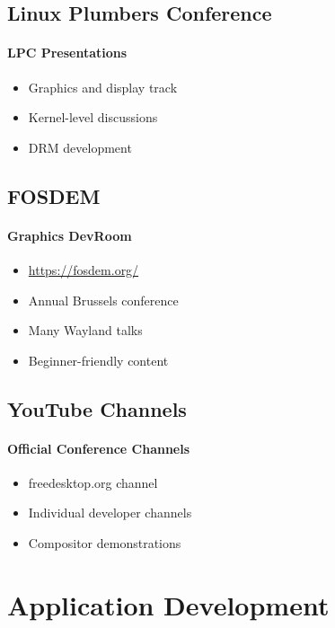 \subsection{Linux Plumbers Conference}

\paragraph{LPC Presentations}
\begin{itemize}
    \item Graphics and display track
    \item Kernel-level discussions
    \item DRM development
\end{itemize}

\subsection{FOSDEM}

\paragraph{Graphics DevRoom}
\begin{itemize}
    \item \url{https://fosdem.org/}
    \item Annual Brussels conference
    \item Many Wayland talks
    \item Beginner-friendly content
\end{itemize}

\subsection{YouTube Channels}

\paragraph{Official Conference Channels}
\begin{itemize}
    \item freedesktop.org channel
    \item Individual developer channels
    \item Compositor demonstrations
\end{itemize}

\section{Application Development}

